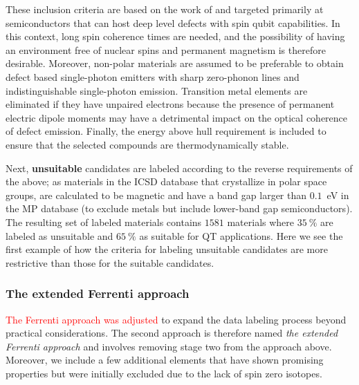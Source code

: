 \documentclass[superscriptaddress,unsortedaddress,
 amsmath,amssymb,
 aps,
]{revtex4-2}
\newcommand{\mrk}[1]{\textcolor{red}{#1}}
\begin{document}
These inclusion criteria are based on the work of \citeauthor{Weber2010} \cite{Weber2010} and targeted primarily at semiconductors that can host deep level defects with spin qubit capabilities. In this context, long spin coherence times are needed, and the possibility of having an environment free of nuclear spins and permanent magnetism is therefore desirable. 
Moreover, non-polar materials are assumed to be preferable to obtain defect based single-photon emitters with sharp zero-phonon lines and indistinguishable single-photon emission.  
Transition metal elements are eliminated if they have unpaired electrons because the presence of permanent electric dipole moments may have a detrimental impact on the optical coherence of defect emission. 
Finally, the energy above hull requirement is included to ensure that the selected compounds are thermodynamically stable. 

Next, \textbf{unsuitable} candidates are labeled according to the reverse requirements of the above; as materials in the ICSD database \cite{Allen1987,Zagorac2019} 
that crystallize in polar space groups, are calculated to be magnetic and have a band gap larger than $0.1$~eV in the MP database (to exclude metals but include lower-band gap semiconductors). 
The resulting set of labeled materials contains $1581$ materials where $35 \ \%$
are labeled as unsuitable and 
$65 \ \%$ as suitable for QT applications.
Here we see the first example of how the criteria for labeling unsuitable candidates are more restrictive than those for the suitable candidates.


\subsubsection*{The extended Ferrenti approach}
\mrk{The Ferrenti approach was adjusted} to expand the data labeling process beyond practical  considerations. The second approach is therefore named \emph{the extended Ferrenti approach} and involves removing stage two from the approach above. Moreover, we include a few additional elements that have shown promising properties but were initially excluded due to the lack of spin zero isotopes. 
\end{document}
